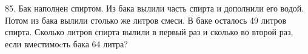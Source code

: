 85. Бак наполнен спиртом. Из бака вылили часть спирта и
дополнили его водой. Потом из бака вылили столько же
литров смеси. В баке осталось 49 литров спирта. Сколько
литров спирта вылили в первый раз и сколько во второй
раз, если вместимоcть бака 64 литра?\\
